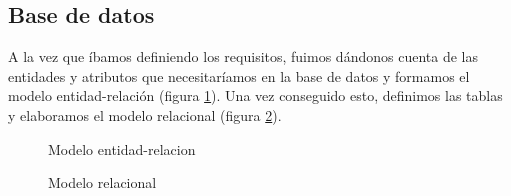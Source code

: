 \subsection{Base de datos}

A la vez que íbamos definiendo los requisitos, fuimos dándonos cuenta de las entidades y atributos que necesitaríamos en la base de datos y formamos el modelo entidad-relación (figura \ref{fig:ent_rel}). Una vez conseguido esto, definimos las tablas y elaboramos el modelo relacional (figura \ref{fig:rel}).

\begin{figure}
\begin{center}
\caption{Modelo entidad-relacion\label{fig:ent_rel}}
\end{center}
\end{figure}

\begin{figure}
\begin{center}
\caption{Modelo relacional\label{fig:rel}}
\end{center}
\end{figure}

